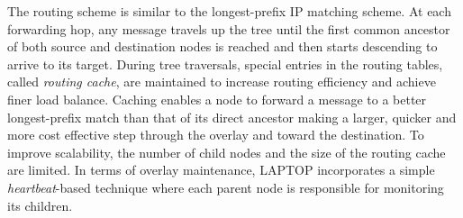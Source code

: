 %

The routing scheme is similar to the longest-prefix IP matching scheme. At each
forwarding hop, any message travels up the tree until the first common ancestor
of both source and destination nodes is reached and then starts descending to
arrive to its target. During tree traversals, special entries in the routing
tables, called \emph{routing cache}, are maintained to increase routing
efficiency and achieve finer load balance. Caching enables a node to forward a
message to a better longest-prefix match than that of its direct ancestor making
a larger, quicker and more cost effective step through the overlay and toward
the destination. To improve scalability, the number of child nodes and the
size of the routing cache are limited. In terms of overlay maintenance, LAPTOP
incorporates a simple \emph{heartbeat}-based technique where each parent node is
responsible for monitoring its children.

%
%

